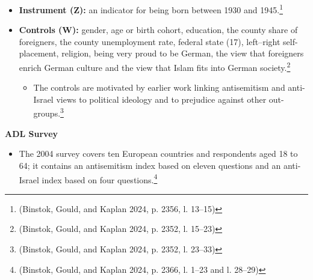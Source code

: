 \begin{itemize}
  \begin{itemize}
  \item
    All five antisemitism items are coded such that higher values indicate more negative views about Jews.\footnote{(Binstok, Gould, and Kaplan 2024, p. 2348, l. 2--13)}
  \item
    For robustness, the mean of the five items and their first factor are used (factor loadings 0.67, 0.62, 0.65, 0.28 and 0.43).\footnote{(Binstok, Gould, and Kaplan 2024, p. 2349, l. 4--8 and fn. 18, l. 19--21)}
  \item
    The mean of the main item is 3.09 (standard deviation 1.92).\footnote{(Binstok, Gould, and Kaplan 2024, Table 6, p. 2347, l. 12)}
  \end{itemize}
\item
  \textbf{Instrument (Z):} an indicator for being born between 1930 and 1945.\footnote{(Binstok, Gould, and Kaplan 2024, p. 2356, l. 13--15)}
\item
  \textbf{Controls (W):} gender, age or birth cohort, education, the county share of foreigners, the county unemployment rate, federal state (17), left--right self-placement, religion, being very proud to be German, the view that foreigners enrich German culture and the view that Islam fits into German society.\footnote{(Binstok, Gould, and Kaplan 2024, p. 2352, l. 15--23)}

  \begin{itemize}
  \item
    The controls are motivated by earlier work linking antisemitism and anti-Israel views to political ideology and to prejudice against other out-groups.\footnote{(Binstok, Gould, and Kaplan 2024, p. 2352, l. 23--33)}
  \end{itemize}
\end{itemize}

\par\textbf{ADL Survey}\par

\begin{itemize}
\item
  The 2004 survey covers ten European countries and respondents aged 18 to 64; it contains an antisemitism index based on eleven questions and an anti-Israel index based on four questions.\footnote{(Binstok, Gould, and Kaplan 2024, p. 2366, l. 1--23 and l. 28--29)}
\end{itemize}

